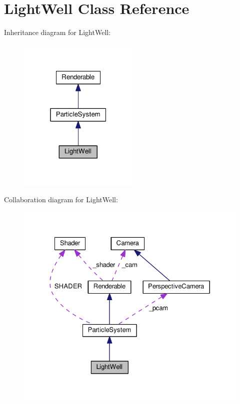 \hypertarget{class_light_well}{}\section{Light\+Well Class Reference}
\label{class_light_well}


Inheritance diagram for Light\+Well\+:\nopagebreak
\begin{figure}[H]
\begin{center}
\leavevmode
\includegraphics[width=163pt]{class_light_well__inherit__graph}
\end{center}
\end{figure}


Collaboration diagram for Light\+Well\+:\nopagebreak
\begin{figure}[H]
\begin{center}
\leavevmode
\includegraphics[width=327pt]{class_light_well__coll__graph}
\end{center}
\end{figure}
